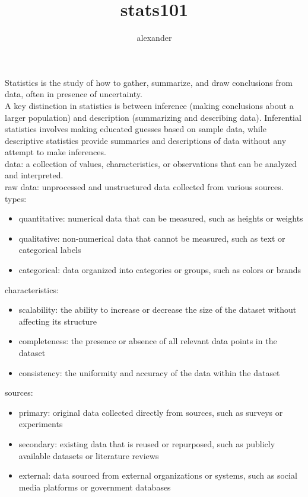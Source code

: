 \documentclass{article}
\title{stats101}
\author{alexander}
\begin{document}
\setlength{\parindent}{0pt}
\maketitle

Statistics is the study of how to gather, summarize, and draw conclusions from data, often in presence of uncertainty.\\

A key distinction in statistics is between inference (making conclusions about a larger population) and 
description (summarizing and describing data). Inferential statistics involves making educated guesses 
based on sample data, while descriptive statistics provide summaries and descriptions of data without any 
attempt to make inferences.\\

data: a collection of values, characteristics, or observations that can be analyzed and interpreted.\\
raw data: unprocessed and unstructured data collected from various sources.\\

types:
	\begin{itemize}
		\item quantitative: numerical data that can be measured, such as heights or weights
		\item qualitative: non-numerical data that cannot be measured, such as text or categorical labels
		\item categorical: data organized into categories or groups, such as colors or brands
	\end{itemize}

characteristics:
	\begin{itemize}
		\item scalability: the ability to increase or decrease the size of the dataset without affecting its structure
		\item completeness: the presence or absence of all relevant data points in the dataset
		\item consistency: the uniformity and accuracy of the data within the dataset
	\end{itemize}

sources:
	\begin{itemize}
		\item primary: original data collected directly from sources, such as surveys or experiments
		\item secondary: existing data that is reused or repurposed, such as publicly available datasets or literature reviews
		\item external: data sourced from external organizations or systems, such as social media platforms or government databases
	\end{itemize}
\end{document}
